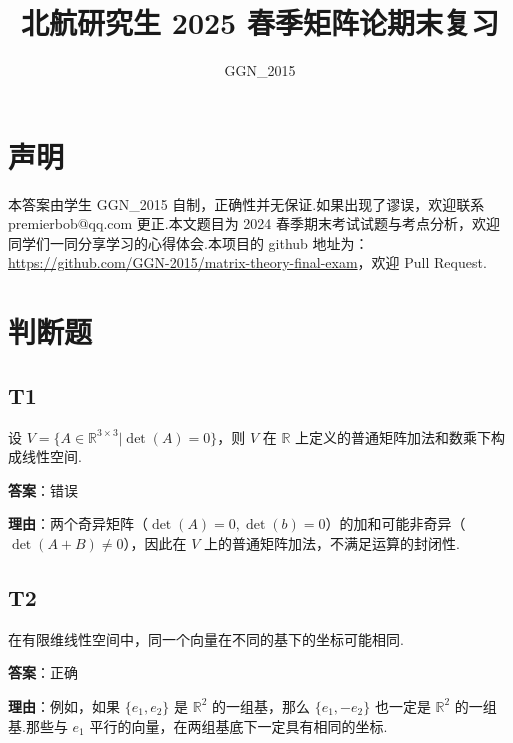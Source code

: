 \documentclass{article}
\title{北航研究生 2025 春季矩阵论期末复习}
\author{GGN\_2015}
\date{}
\begin{document}
\maketitle

\section{声明}

本答案由学生 GGN\_2015 自制，正确性并无保证.如果出现了谬误，欢迎联系 premierbob@qq.com 更正.本文题目为 2024 春季期末考试试题与考点分析，欢迎同学们一同分享学习的心得体会.本项目的 github 地址为：\href{https://github.com/GGN-2015/matrix-theory-final-exam}{https://github.com/GGN-2015/matrix-theory-final-exam}，欢迎 Pull Request.

\newpage

\tableofcontents

\newpage

\section{判断题}

\subsection{T1}

\par 设 \(V=\{A\in \mathbb R^{3\times 3}| \det(A) = 0\}\)，则 $V$ 在 $\mathbb R$ 上定义的普通矩阵加法和数乘下构成线性空间.

\par \textbf{答案}：错误

\par \textbf{理由}：两个奇异矩阵（$\det(A)=0, \det(b)=0$）的加和可能非奇异（$\det(A+B)\neq 0$），因此在 $V$ 上的普通矩阵加法，不满足运算的封闭性.

\subsection{T2}

\par 在有限维线性空间中，同一个向量在不同的基下的坐标可能相同.

\par \textbf{答案}：正确

\par \textbf{理由}：例如，如果 $\{e_1, e_2\}$ 是 $\mathbb R^2$ 的一组基，那么 \(\{e_1, -e_2\}\) 也一定是 $\mathbb R^2$ 的一组基.那些与 $e_1$ 平行的向量，在两组基底下一定具有相同的坐标.
\end{document}
